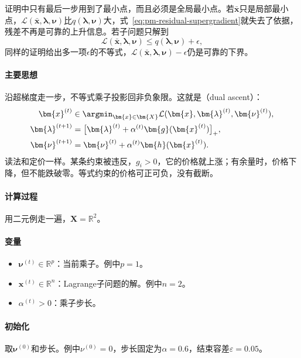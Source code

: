 证明中只有最后一步用到了最小点，而且必须是全局最小点。若$\bar{\bm{x}}$只是局部最小点，$\mathcal{L}(\bar{\bm{x}},\bm{\lambda},\bm{\nu})$比$q(\bm{\lambda},\bm{\nu})$大，式~\eqref{eq:pm-residual-supergradient}就失去了依据，残差不再是可靠的上升信息。若子问题只解到
\[
 \mathcal{L}(\bar{\bm{x}},\bm{\lambda},\bm{\nu})\leq q(\bm{\lambda},\bm{\nu})+\epsilon,
\]
同样的证明给出多一项$\epsilon$的不等式，$\mathcal{L}(\bar{\bm{x}},\bm{\lambda},\bm{\nu})-\epsilon$仍是可靠的下界。

\paragraph{主要思想}
沿超梯度走一步，不等式乘子投影回非负象限。这就是（dual ascent）：
\begin{equation}
 \begin{aligned}
 \bm{x}^{(t)}&\in\argmin_{\bm{x}\in\bm{X}}\mathcal{L}(\bm{x},\bm{\lambda}^{(t)},\bm{\nu}^{(t)}),\\
 \bm{\lambda}^{(t+1)}&=\bigl[\bm{\lambda}^{(t)}+\alpha^{(t)}\bm{g}(\bm{x}^{(t)})\bigr]_+,\\
 \bm{\nu}^{(t+1)}&=\bm{\nu}^{(t)}+\alpha^{(t)}\bm{h}(\bm{x}^{(t)}).
 \end{aligned}
 \label{eq:pm-dual-ascent}
\end{equation}
读法和定价一样。某条约束被违反，$g_i>0$，它的价格就上涨；有余量时，价格下降，但不能跌破零。等式约束的价格可正可负，没有截断。

\paragraph{计算过程}
用二元例走一遍，$\bm{X}=\mathbb{R}^2$。

\paragraph{变量}
\begin{itemize}
 \item $\bm{\nu}^{(t)}\in\mathbb{R}^p$：当前乘子。例中$p=1$。
 \item $\bm{x}^{(t)}\in\mathbb{R}^n$：Lagrange子问题的解。例中$n=2$。
 \item $\alpha^{(t)}>0$：乘子步长。
\end{itemize}

\paragraph{初始化}
取$\bm{\nu}^{(0)}$和步长。例中$\nu^{(0)}=0$，步长固定为$\alpha=0.6$，结束容差$\varepsilon=0.05$。

